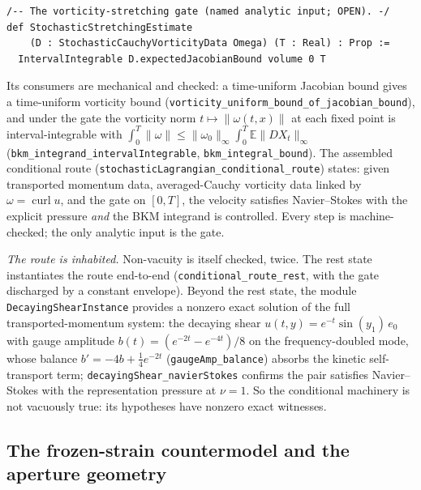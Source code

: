 \documentclass[11pt]{article}
\theoremstyle{definition}
\begin{document}
\begin{lstlisting}[language={}]
/-- The vorticity-stretching gate (named analytic input; OPEN). -/
def StochasticStretchingEstimate
    (D : StochasticCauchyVorticityData Omega) (T : Real) : Prop :=
  IntervalIntegrable D.expectedJacobianBound volume 0 T
\end{lstlisting}

Its consumers are mechanical and checked: a time-uniform Jacobian bound gives
a time-uniform vorticity bound
(\texttt{vorticity\_uniform\_bound\_of\_jacobian\_bound}), and under the gate
the vorticity norm $t\mapsto\|\omega(t,x)\|$ at each fixed point is interval-integrable with
$\int_0^T\|\omega\| \le \|\omega_0\|_\infty \int_0^T
\mathbb{E}\|DX_t\|_\infty$
(\texttt{bkm\_integrand\_intervalIntegrable}, \texttt{bkm\_integral\_bound}).
The assembled conditional route
(\texttt{stochasticLagrangian\_conditional\_route}) states: given transported
momentum data, averaged-Cauchy vorticity data linked by
$\omega=\operatorname{curl}u$, and the gate on $[0,T]$, the velocity
satisfies Navier--Stokes with the explicit pressure \emph{and} the BKM
integrand is controlled.  Every step is machine-checked; the only analytic
input is the gate.

\emph{The route is inhabited.}  Non-vacuity is itself checked, twice.  The
rest state instantiates the route end-to-end
(\texttt{conditional\_route\_rest}, with the gate discharged by a constant
envelope).  Beyond the rest state, the module \texttt{DecayingShearInstance}
provides a nonzero exact solution of the full transported-momentum system:
the decaying shear $u(t,y)=e^{-t}\sin(y_1)\,e_0$ with gauge amplitude
$b(t)=(e^{-2t}-e^{-4t})/8$ on the frequency-doubled mode, whose balance
$b'=-4b+\tfrac14 e^{-2t}$ (\texttt{gaugeAmp\_balance}) absorbs the kinetic
self-transport term; \texttt{decayingShear\_navierStokes} confirms the pair
satisfies Navier--Stokes with the representation pressure at $\nu=1$.  So the
conditional machinery is not vacuously true: its hypotheses have nonzero
exact witnesses.

\subsection{The frozen-strain countermodel and the aperture geometry}
\label{sec:frozen}
\end{document}
